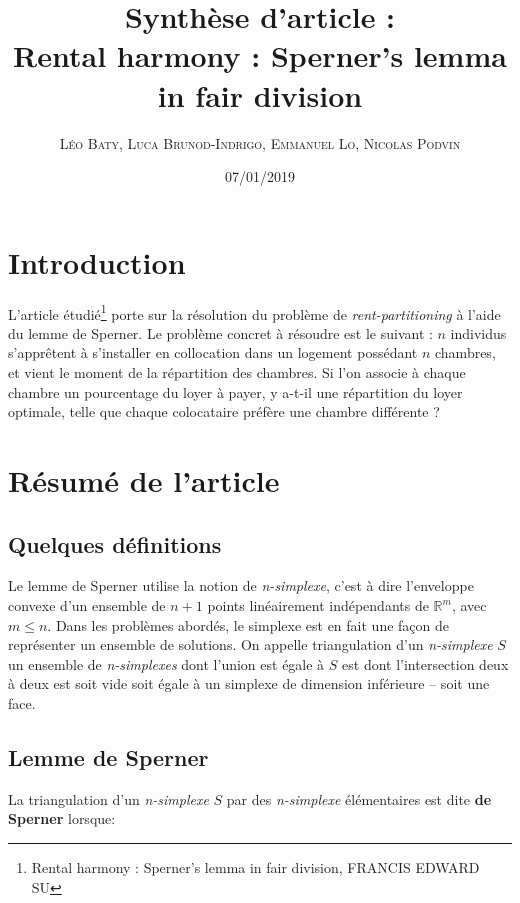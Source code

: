 \documentclass[12pt,twoside,a4paper]{article}
\title{\textbf{Synth\`ese d'article} :\\ Rental harmony : Sperner's lemma in fair division}
\author{\textsc{L\'eo Baty, Luca Brunod-Indrigo, Emmanuel Lo, Nicolas Podvin}}
\date{07/01/2019}
\begin{document}
\maketitle


\tableofcontents

\newpage

\section{Introduction}

L'article \'etudi\'e\footnote{Rental harmony : Sperner's lemma in fair division, FRANCIS EDWARD SU} porte sur la r\'esolution du probl\`eme de \textit{rent-partitioning} \`a l'aide du lemme de Sperner. Le probl\`eme concret \`a r\'esoudre est le suivant : $n$ individus s'appr\^{e}tent \`a s'installer en collocation dans un logement poss\'edant $n$ chambres, et vient le moment de la r\'epartition des chambres. Si l'on associe \`a chaque chambre un pourcentage du loyer \`a payer, y a-t-il une r\'epartition du loyer optimale, telle que chaque colocataire pr\'ef\`ere une chambre diff\'erente ? 

\section{R\'esum\'e de l'article}

\subsection{Quelques d\'efinitions}

Le lemme de Sperner utilise la notion de \textit{n-simplexe}, c’est à dire l’enveloppe convexe d’un ensemble de $n+1$ points linéairement indépendants de $\mathbb{R}^m$, avec $m\leq n$. Dans les problèmes abordés, le simplexe est en fait une façon de représenter un ensemble de solutions.
On appelle triangulation d’un \textit{n-simplexe} $S$ un ensemble de \textit{n-simplexes} dont l’union est égale à $S$ est dont l’intersection deux à deux est soit vide soit égale à un simplexe de dimension inférieure -- soit une face.

\subsection{Lemme de Sperner}

La triangulation d'un \textit{n-simplexe} $S$ par des \textit{n-simplexe} \'el\'ementaires est dite \textbf{de Sperner} lorsque:
\end{document}
